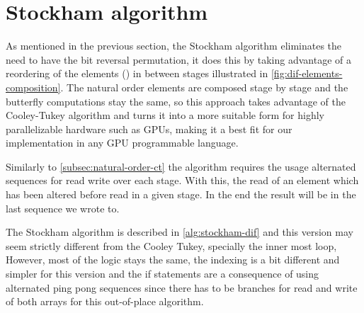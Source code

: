 \documentclass[
  oneside,
  11pt, a4paper,
  footinclude=true,
  headinclude=true,
  cleardoublepage=empty
]{scrbook}
\begin{document}
\section{Stockham algorithm} \label{subsec:stockham-algorithm}

As mentioned in the previous section, the Stockham algorithm eliminates the need to have the bit reversal permutation, it does this by taking advantage of a reordering of the elements (\cite{govindaraju2008high}) in between stages illustrated in \autoref{fig:dif-elements-composition}. The natural order elements are composed stage by stage and the butterfly computations stay the same, so this approach takes advantage of the Cooley-Tukey algorithm and turns it into a more suitable form for highly parallelizable hardware such as GPUs, making it a best fit for our implementation in any GPU programmable language. \newline

Similarly to \autoref{subsec:natural-order-ct} the algorithm requires the usage alternated sequences for read write over each stage. With this, the read of an element which has been altered before read in a given stage. In the end the result will be in the last sequence we wrote to.
\newline

The Stockham algorithm is described in \autoref{alg:stockham-dif} and this version may seem strictly different from the Cooley Tukey, specially the inner most loop, However, most of the logic stays the same, the indexing is a bit different and simpler for this version and the if statements are a consequence of using alternated ping pong sequences since there has to be branches for read and write of both arrays for this out-of-place algorithm.


\end{document}
